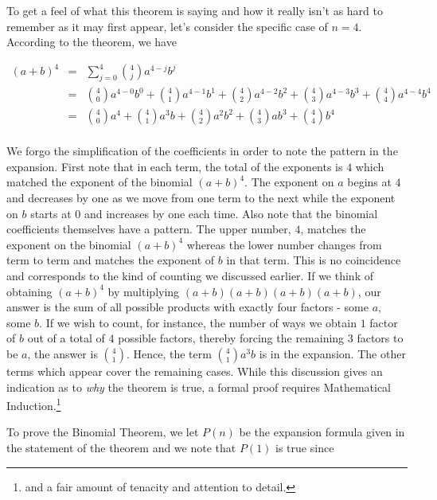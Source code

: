 To get a feel of what this theorem is saying and how it really isn't as hard to remember as it may first appear, let's consider the specific case of $n=4$.  According to the theorem, we have

\[ \begin{array}{rcl}

(a+b)^{4} & = & \displaystyle{\sum_{j=0}^{4} \binom{4}{j} a^{4-j} b^{j}} \\ [15pt]
          & = & \displaystyle{\binom{4}{0}a^{4-0}b^{0} + \binom{4}{1}a^{4-1}b^{1} + \binom{4}{2}a^{4-2}b^{2} + \binom{4}{3}a^{4-3}b^{3} + \binom{4}{4}a^{4-4}b^{4}} \\ [15pt] 
          & = & \displaystyle{\binom{4}{0}a^{4} + \binom{4}{1}a^{3}b + \binom{4}{2}a^{2}b^{2} + \binom{4}{3}ab^{3} + \binom{4}{4}b^{4}} \\
          
\end{array} \] 

We forgo the simplification of the coefficients in order to note the pattern in the expansion.  First note that in each term, the total of the exponents is $4$ which matched the exponent of the binomial $(a+b)^{4}$.  The exponent on $a$ begins at $4$ and decreases by one as we move from one term to the next while the exponent on $b$ starts at $0$ and increases by one each time.  Also note that the binomial coefficients themselves have a pattern. The upper number, $4$, matches the exponent on the binomial $(a+b)^4$ whereas the lower number changes from term to term and matches the exponent of $b$ in that term.  This is no coincidence and corresponds to the kind of counting we discussed earlier.  If we think of obtaining $(a+b)^4$ by multiplying $(a+b)(a+b)(a+b)(a+b)$, our answer is the sum of all possible products with exactly four factors - some $a$, some $b$.  If we wish to count, for instance, the number of ways we obtain $1$ factor of $b$ out of a total of $4$ possible factors, thereby forcing the remaining $3$ factors to be $a$, the answer is $\binom{4}{1}$.  Hence, the term  $\binom{4}{1}a^{3}b$ is in the expansion.  The other terms which appear cover the remaining cases.  While this discussion gives an indication as to \textit{why} the theorem is true, a formal proof requires Mathematical Induction.\footnote{and a fair amount of tenacity and attention to detail.}

\medskip

To prove the Binomial Theorem, we let $P(n)$ be the expansion formula given in the statement of the theorem and we note that $P(1)$ is true since

